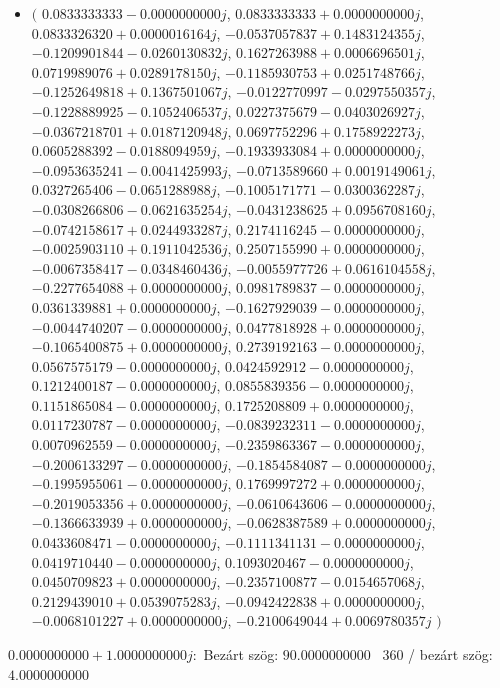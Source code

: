 \documentclass[14pt,a4paper]{article}
\begin{document}
\begin{itemize}
\item
$\big($
$0.0833333333-0.0000000000j$, $0.0833333333+0.0000000000j$, $0.0833326320+0.0000016164j$, $-0.0537057837+0.1483124355j$, $-0.1209901844-0.0260130832j$, $0.1627263988+0.0006696501j$, $0.0719989076+0.0289178150j$, $-0.1185930753+0.0251748766j$, $-0.1252649818+0.1367501067j$, $-0.0122770997-0.0297550357j$, $-0.1228889925-0.1052406537j$, $0.0227375679-0.0403026927j$, $-0.0367218701+0.0187120948j$, $0.0697752296+0.1758922273j$, $0.0605288392-0.0188094959j$, $-0.1933933084+0.0000000000j$, $-0.0953635241-0.0041425993j$, $-0.0713589660+0.0019149061j$, $0.0327265406-0.0651288988j$, $-0.1005171771-0.0300362287j$, $-0.0308266806-0.0621635254j$, $-0.0431238625+0.0956708160j$, $-0.0742158617+0.0244933287j$, $0.2174116245-0.0000000000j$, $-0.0025903110+0.1911042536j$, $0.2507155990+0.0000000000j$, $-0.0067358417-0.0348460436j$, $-0.0055977726+0.0616104558j$, $-0.2277654088+0.0000000000j$, $0.0981789837-0.0000000000j$, $0.0361339881+0.0000000000j$, $-0.1627929039-0.0000000000j$, $-0.0044740207-0.0000000000j$, $0.0477818928+0.0000000000j$, $-0.1065400875+0.0000000000j$, $0.2739192163-0.0000000000j$, $0.0567575179-0.0000000000j$, $0.0424592912-0.0000000000j$, $0.1212400187-0.0000000000j$, $0.0855839356-0.0000000000j$, $0.1151865084-0.0000000000j$, $0.1725208809+0.0000000000j$, $0.0117230787-0.0000000000j$, $-0.0839232311-0.0000000000j$, $0.0070962559-0.0000000000j$, $-0.2359863367-0.0000000000j$, $-0.2006133297-0.0000000000j$, $-0.1854584087-0.0000000000j$, $-0.1995955061-0.0000000000j$, $0.1769997272+0.0000000000j$, $-0.2019053356+0.0000000000j$, $-0.0610643606-0.0000000000j$, $-0.1366633939+0.0000000000j$, $-0.0628387589+0.0000000000j$, $0.0433608471-0.0000000000j$, $-0.1111341131-0.0000000000j$, $0.0419710440-0.0000000000j$, $0.1093020467-0.0000000000j$, $0.0450709823+0.0000000000j$, $-0.2357100877-0.0154657068j$, $0.2129439010+0.0539075283j$, $-0.0942422838+0.0000000000j$, $-0.0068101227+0.0000000000j$, $-0.2100649044+0.0069780357j$
$\big)$
\end{itemize}
$0.0000000000+1.0000000000j$:\
Bezárt szög: $90.0000000000$ \
360 / bezárt szög: $4.0000000000$\
\end{document}
